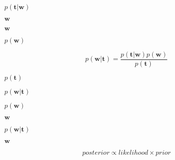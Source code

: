 \documentclass[10pt]{book}
\begin{document}
\begin{mdSnippets}
\begin{mdInlineSnippet}
$p(\textbf{t}|\textbf{w})$\end{mdInlineSnippet}%
\begin{mdInlineSnippet}[e8d1025023b4b2aa1dda755aa92e085d]%
$\textbf{w}$\end{mdInlineSnippet}%
\begin{mdInlineSnippet}[e8d1025023b4b2aa1dda755aa92e085d]%
$\textbf{w}$\end{mdInlineSnippet}%
\begin{mdInlineSnippet}[27a66549da84fe3137dcf53f476c6197]%
$p(\textbf{w})$\end{mdInlineSnippet}%
\begin{mdDisplaySnippet}%
\[%
p(\textbf{w}|\textbf{t})=\frac{p(\textbf{t}|\textbf{w})p(\textbf{w})}{p(\textbf{t})}
\]%
\end{mdDisplaySnippet}%
\begin{mdInlineSnippet}[f983f8e5d0b7f303ec9236a35dfe2073]%
$p(\textbf{t})$\end{mdInlineSnippet}%
\begin{mdInlineSnippet}[6d221e861e7985e10d53c0f282510d8a]%
$p(\textbf{w}|\textbf{t})$\end{mdInlineSnippet}%
\begin{mdInlineSnippet}[27a66549da84fe3137dcf53f476c6197]%
$p(\textbf{w})$\end{mdInlineSnippet}%
\begin{mdInlineSnippet}[e8d1025023b4b2aa1dda755aa92e085d]%
$\textbf{w}$\end{mdInlineSnippet}%
\begin{mdInlineSnippet}[6d221e861e7985e10d53c0f282510d8a]%
$p(\textbf{w}|\textbf{t})$\end{mdInlineSnippet}%
\begin{mdInlineSnippet}[e8d1025023b4b2aa1dda755aa92e085d]%
$\textbf{w}$\end{mdInlineSnippet}%
\begin{mdDisplaySnippet}[181e80830a2dbf821d8c5fd6c1879ac5]%
\[%
posterior \propto likelihood \times prior
\]%
\end{mdDisplaySnippet}%
\begin{mdInlineSnippet}[e8d1025023b4b2aa1dda755aa92e085d]%

\end{mdInlineSnippet}
\end{mdSnippets}
\end{document}
